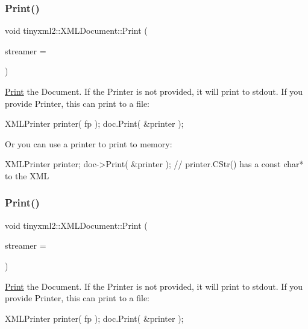 \subsubsection{\texorpdfstring{Print()}{Print()}\hspace{0.1cm}{\footnotesize\ttfamily [1/2]}}
{\footnotesize\ttfamily void tinyxml2\+::\+X\+M\+L\+Document\+::\+Print (\begin{DoxyParamCaption}\item[{\hyperlink{classtinyxml2_1_1XMLPrinter}{X\+M\+L\+Printer} $\ast$}]{streamer = {} }\end{DoxyParamCaption})}

\hyperlink{classPrint}{Print} the Document. If the Printer is not provided, it will print to stdout. If you provide Printer, this can print to a file\+: \begin{DoxyVerb}XMLPrinter printer( fp );
doc.Print( &printer );
\end{DoxyVerb}


Or you can use a printer to print to memory\+: \begin{DoxyVerb}XMLPrinter printer;
doc->Print( &printer );
// printer.CStr() has a const char* to the XML
\end{DoxyVerb}
 \mbox{\label{classtinyxml2_1_1XMLDocument_a2e57602756e197341711a4a0b84c52c5}} 
\subsubsection{\texorpdfstring{Print()}{Print()}\hspace{0.1cm}{\footnotesize\ttfamily [2/2]}}
{\footnotesize\ttfamily void tinyxml2\+::\+X\+M\+L\+Document\+::\+Print (\begin{DoxyParamCaption}\item[{\hyperlink{classtinyxml2_1_1XMLPrinter}{X\+M\+L\+Printer} $\ast$}]{streamer = {} }\end{DoxyParamCaption})}

\hyperlink{classPrint}{Print} the Document. If the Printer is not provided, it will print to stdout. If you provide Printer, this can print to a file\+: \begin{DoxyVerb}XMLPrinter printer( fp );
doc.Print( &printer );
\end{DoxyVerb}



